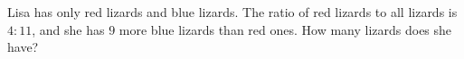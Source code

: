 Lisa has only red lizards and blue lizards. The ratio of red lizards to all lizards is $4:11$, and she has $9$ more blue lizards than red ones. How many lizards does she have?
